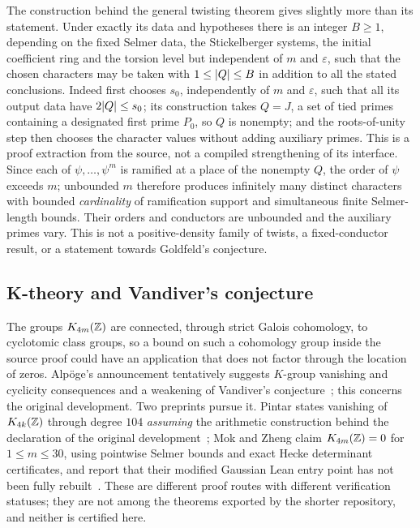 \begin{remark}\label{sel:rem:boundedsupport}
The construction behind the general twisting theorem gives slightly more
than its statement. Under exactly its data and hypotheses there is an
integer $B\ge1$, depending on the fixed Selmer data, the Stickelberger
systems, the initial coefficient ring and the torsion level but independent
of $m$ and $\varepsilon$, such that the chosen characters may be taken with
$1\le\lvert Q\rvert\le B$ in addition to all the stated conclusions. Indeed
 first chooses $s_0$, independently of $m$ and
$\varepsilon$, such that all its output data have $2\lvert Q\rvert\le s_0$; its
construction takes $Q=J$, a set of tied primes containing a designated
first prime $P_0$, so $Q$ is nonempty; and the roots-of-unity step then
chooses the character values without adding auxiliary primes. This is a
proof extraction from the source, not a compiled strengthening of its
interface. Since each of $\psi,\dots,\psi^m$ is ramified at a place of the
nonempty $Q$, the order of $\psi$ exceeds $m$; unbounded $m$ therefore
produces infinitely many distinct characters with bounded \emph{cardinality}
of ramification support and simultaneous finite Selmer-length bounds. Their
orders and conductors are unbounded and the auxiliary primes vary. This is
not a positive-density family of twists, a fixed-conductor result, or a
statement towards Goldfeld's conjecture.
\end{remark}

\subsection{K-theory and Vandiver's conjecture}\label{sel:sec:ktheory}

The groups $K_{4m}(\mathbb{Z})$ are connected, through strict Galois cohomology, to
cyclotomic class groups, so a bound on such a cohomology group inside the
source proof could have an application that does not factor through the
location of zeros. Alp\"oge's announcement tentatively suggests $K$-group
vanishing and cyclicity consequences and a weakening of Vandiver's
conjecture~\cite{Alpoge2026Remark}; this concerns the original development.
Two preprints pursue it. Pintar states vanishing of $K_{4k}(\mathbb{Z})$ through
degree $104$ \emph{assuming} the arithmetic construction behind the
declaration  of the original
development~\cite{Pintar2026Vanishing}; Mok and Zheng claim
$K_{4m}(\mathbb{Z})=0$ for $1\le m\le30$, using pointwise Selmer bounds and exact
Hecke determinant certificates, and report that their modified Gaussian
Lean entry point has not been fully rebuilt~\cite{Mok2026Vanishing}. These
are different proof routes with different verification statuses; they are
not among the theorems exported by the shorter repository, and neither is
certified here.

